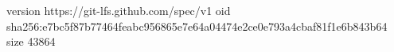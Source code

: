 version https://git-lfs.github.com/spec/v1
oid sha256:e7bc5f87b77464feabc956865e7e64a04474e2ce0e793a4cbaf81f1e6b843b64
size 43864
